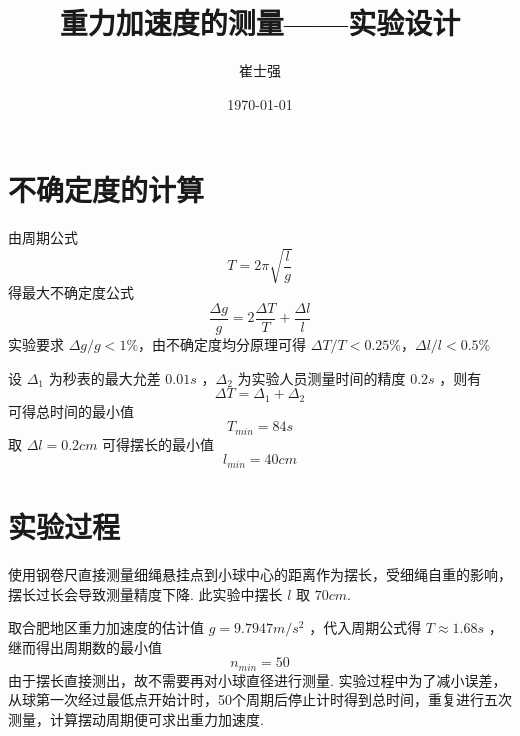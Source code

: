 \documentclass[UTF8]{ctexart}
\title{重力加速度的测量——实验设计}
\author{崔士强}
\date{\today}
\begin{document}
\maketitle
\section{不确定度的计算}
\noindent 由周期公式
\[T=2\pi \sqrt{\frac{l}{g}}\]
得最大不确定度公式
\[\frac{\Delta g}{g}=2\frac{\Delta T}{T}+\frac{\Delta l}{l}\]
实验要求 $\Delta g/g<1\%$，由不确定度均分原理可得 $\Delta T/T<0.25\%$，$\Delta l/l<0.5\%$

\noindent 设 $\Delta_1$ 为秒表的最大允差 $0.01s$ ，$\Delta_2$ 为实验人员测量时间的精度 $0.2s$ ，则有
\[\Delta T=\Delta_{1}+\Delta_{2}\]
可得总时间的最小值
\[T_{min}=84s\]
取 $\Delta l=0.2cm$ 可得摆长的最小值
\[l_{min}=40cm\]
\section{实验过程}
使用钢卷尺直接测量细绳悬挂点到小球中心的距离作为摆长，受细绳自重的影响，摆长过长会导致测量精度下降.
此实验中摆长 $l$ 取 $70cm$.

取合肥地区重力加速度的估计值 $g=9.7947m/s^2$ ，代入周期公式得 $T\approx 1.68s$ ，继而得出周期数的最小值
\[n_{min}=50\]
\indent 由于摆长直接测出，故不需要再对小球直径进行测量.
实验过程中为了减小误差，从球第一次经过最低点开始计时，50个周期后停止计时得到总时间，重复进行五次测量，计算摆动周期便可求出重力加速度.

\end{document}
